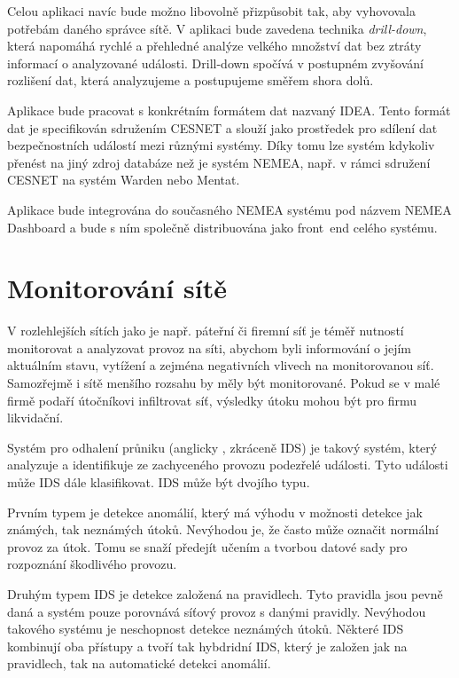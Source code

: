 Celou aplikaci navíc bude možno libovolně přizpůsobit tak, aby vyhovovala potřebám daného správce sítě. V aplikaci bude zavedena technika {\it drill-down}, která napomáhá rychlé a přehledné analýze velkého množství dat bez ztráty informací o analyzované události. Drill-down spočívá v postupném zvyšování rozlišení dat, která analyzujeme a postupujeme směřem shora dolů.

Aplikace bude pracovat s konkrétním formátem dat nazvaný IDEA. Tento formát dat je specifikován sdružením CESNET a slouží jako prostředek pro sdílení dat bezpečnostních událostí mezi různými systémy. Díky tomu lze systém kdykoliv přenést na jiný zdroj databáze než je systém NEMEA, např. v rámci sdružení CESNET na systém Warden nebo Mentat.

Aplikace bude integrována do současného NEMEA systému pod názvem NEMEA Dashboard a bude s ním společně distribuována jako front~end celého systému.

\chapter{Monitorování sítě}

V rozlehlejších sítích jako je např. páteřní či firemní síť je téměř nutností monitorovat a analyzovat provoz na síti, abychom byli informování o jejím aktuálním stavu, vytížení a zejména negativních vlivech na monitorovanou síť. Samozřejmě i sítě menšího rozsahu by měly být monitorované. Pokud se v malé firmě podaří útočníkovi infiltrovat síť, výsledky útoku mohou být pro firmu likvidační.

Systém pro odhalení průniku (anglicky , zkráceně IDS)\cite{idsips} je takový systém, který analyzuje a identifikuje ze zachyceného provozu podezřelé události. Tyto události může IDS dále klasifikovat. IDS může být dvojího typu. 

Prvním typem je detekce anomálií, který má výhodu v možnosti detekce jak známých, tak neznámých útoků. Nevýhodou je, že často může označit normální provoz za útok. Tomu se snaží předejít učením a tvorbou datové sady pro rozpoznání škodlivého provozu.

Druhým typem IDS je detekce založená na pravidlech. Tyto pravidla jsou pevně daná a systém pouze porovnává síťový provoz s danými pravidly. Nevýhodou takového systému je neschopnost detekce neznámých útoků. Některé IDS kombinují oba přístupy a tvoří tak hybdridní IDS, který je založen jak na pravidlech, tak na automatické detekci anomálií.

